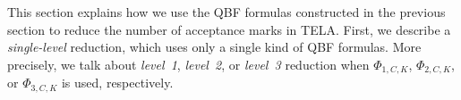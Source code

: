 \documentclass[a4paper,UKenglish,cleveref,autoref,thm-restate]{lipics-v2021}
\newcommand{\rem}{\mathit{nm}}
\def\false{\mathit{false}}
\def\true{\mathit{true}}
\newcommand{\mA}{\mathcal{A}}
\begin{document}
This section explains how we use the QBF formulas constructed in the
previous section to reduce the number of acceptance marks in TELA.
First, we describe a \emph{single-level} reduction, which
uses only a single kind of QBF formulas. More precisely, we talk about
\emph{level~1}, \emph{level~2}, or \emph{level~3} reduction when
$\Phi_{1,C,K}$, $\Phi_{2,C,K}$, or
$\Phi_{3,C,K}$ is used, respectively.

\end{document}
